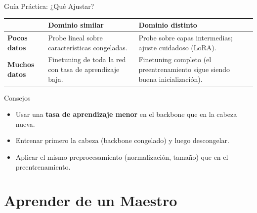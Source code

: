 \documentclass[aspectratio=169, 10pt]{beamer}
\begin{document}
\begin{frame}{Gu\'ia Pr\'actica: ¿Qu\'e Ajustar?}

	\begin{center}
		\renewcommand{\arraystretch}{1.6}
		\begin{tabular}{l|p{4.6cm}|p{4.6cm}}
			\toprule
			& \textbf{Dominio similar} & \textbf{Dominio distinto} \\
			\midrule
			\textbf{Pocos datos} & Probe lineal sobre caracter\'isticas congeladas. & Probe sobre capas intermedias; ajuste cuidadoso (LoRA). \\
			\textbf{Muchos datos} & Finetuning de toda la red con tasa de aprendizaje baja. & Finetuning completo (el preentrenamiento sigue siendo buena inicializaci\'on). \\
			\bottomrule
		\end{tabular}
	\end{center}

	\vspace{0.3cm}

	\begin{alertblock}{Consejos}
		\begin{itemize}
			\item Usar una \textbf{tasa de aprendizaje menor} en el backbone que en la cabeza nueva.
			\item Entrenar primero la cabeza (backbone congelado) y luego descongelar.
			\item Aplicar el mismo preprocesamiento (normalizaci\'on, tama\~no) que en el preentrenamiento.
		\end{itemize}
	\end{alertblock}

\end{frame}

\section{Aprender de un Maestro}
\end{document}
